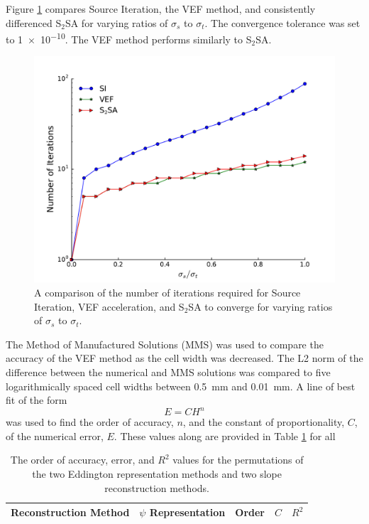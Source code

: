 Figure \ref{fig:si_vef_s2sa} compares Source Iteration, the VEF method, and consistently differenced S$_2$SA for varying ratios of $\sigma_s$ to $\sigma_t$. The convergence tolerance was set to \num{1e-10}. The VEF method performs similarly to S$_2$SA. 

	\begin{figure}
		\centering
		\includegraphics[width=.75\textwidth]{figs/si_vef_s2sa.pdf} 
		\caption{A comparison of the number of iterations required for Source Iteration, VEF acceleration, and S$_2$SA to converge for varying ratios of $\sigma_s$ to $\sigma_t$. } 
		\label{fig:si_vef_s2sa}
	\end{figure}

The Method of Manufactured Solutions (MMS) was used to compare the accuracy of the VEF method as the cell width was decreased. The L2 norm of the difference between the numerical and MMS solutions was compared to five logarithmically spaced cell widths between \SI{0.5}{mm} and \SI{0.01}{mm}. A line of best fit of the form 
	\begin{equation}
		E = C H^n
	\end{equation}
was used to find the order of accuracy, $n$, and the constant of proportionality, $C$, of the numerical error, $E$. These values along are provided in Table \ref{tab:mms} for all 

	\begin{table} \centering
	\begin{tabular}{|c|c|c|c|c|}
	\hline
	\hline
	Reconstruction Method & $\psi$ Representation & Order & $C$ & $R^2$ \\ 
	\hline
		
	\hline
	\hline
	\end{tabular}
	\caption{The order of accuracy, error, and $R^2$ values for the permutations of the two Eddington representation methods and two slope reconstruction methods. }
	\label{tab:mms}
	\end{table}
	\afterpage{\clearpage}

